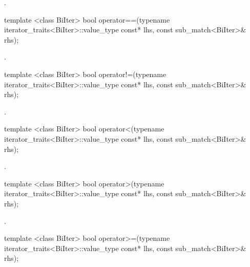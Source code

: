 \begin{itemdescr}
\pnum\returns  {}.
\end{itemdescr}

%
\begin{itemdecl}
template <class BiIter> 
  bool operator==(typename iterator_traits<BiIter>::value_type const* lhs, 
                  const sub_match<BiIter>& rhs); 
\end{itemdecl}

\begin{itemdescr}
\pnum\returns  {}.
\end{itemdescr}

%
\begin{itemdecl}
template <class BiIter> 
  bool operator!=(typename iterator_traits<BiIter>::value_type const* lhs, 
                  const sub_match<BiIter>& rhs); 
\end{itemdecl}

\begin{itemdescr}
\pnum\returns  {}.
\end{itemdescr}

%
\begin{itemdecl}
template <class BiIter> 
  bool operator<(typename iterator_traits<BiIter>::value_type const* lhs, 
                 const sub_match<BiIter>& rhs); 
\end{itemdecl}

\begin{itemdescr}
\pnum\returns  {}.
\end{itemdescr}

%
\begin{itemdecl}
template <class BiIter> 
  bool operator>(typename iterator_traits<BiIter>::value_type const* lhs, 
                 const sub_match<BiIter>& rhs); 
\end{itemdecl}

\begin{itemdescr}
\pnum\returns  {}.
\end{itemdescr}

%
\begin{itemdecl}
template <class BiIter> 
  bool operator>=(typename iterator_traits<BiIter>::value_type const* lhs, 
                  const sub_match<BiIter>& rhs); 
\end{itemdecl}

